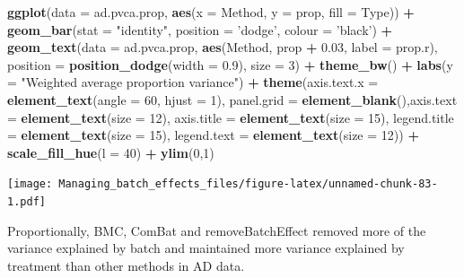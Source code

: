 \documentclass[]{book}
\newenvironment{Shaded}{\begin{snugshade}}{\end{snugshade}}
\newcommand{\KeywordTok}[1]{\textcolor[rgb]{0.13,0.29,0.53}{\textbf{#1}}}
\newcommand{\DataTypeTok}[1]{\textcolor[rgb]{0.13,0.29,0.53}{#1}}
\newcommand{\DecValTok}[1]{\textcolor[rgb]{0.00,0.00,0.81}{#1}}
\newcommand{\FloatTok}[1]{\textcolor[rgb]{0.00,0.00,0.81}{#1}}
\newcommand{\StringTok}[1]{\textcolor[rgb]{0.31,0.60,0.02}{#1}}
\newcommand{\OperatorTok}[1]{\textcolor[rgb]{0.81,0.36,0.00}{\textbf{#1}}}
\newcommand{\NormalTok}[1]{#1}
\begin{document}
\begin{Shaded}
\begin{Highlighting}[]
\KeywordTok{ggplot}\NormalTok{(}\DataTypeTok{data =}\NormalTok{ ad.pvca.prop, }\KeywordTok{aes}\NormalTok{(}\DataTypeTok{x =}\NormalTok{ Method, }\DataTypeTok{y =}\NormalTok{ prop, }\DataTypeTok{fill =}\NormalTok{ Type)) }\OperatorTok{+}\StringTok{ }
\StringTok{  }\KeywordTok{geom_bar}\NormalTok{(}\DataTypeTok{stat =} \StringTok{"identity"}\NormalTok{, }\DataTypeTok{position =} \StringTok{'dodge'}\NormalTok{, }\DataTypeTok{colour =} \StringTok{'black'}\NormalTok{) }\OperatorTok{+}\StringTok{ }
\StringTok{  }\KeywordTok{geom_text}\NormalTok{(}\DataTypeTok{data =}\NormalTok{ ad.pvca.prop, }\KeywordTok{aes}\NormalTok{(Method, prop }\OperatorTok{+}\StringTok{ }\FloatTok{0.03}\NormalTok{, }\DataTypeTok{label =}\NormalTok{ prop.r), }
            \DataTypeTok{position =} \KeywordTok{position_dodge}\NormalTok{(}\DataTypeTok{width =} \FloatTok{0.9}\NormalTok{), }\DataTypeTok{size =} \DecValTok{3}\NormalTok{) }\OperatorTok{+}\StringTok{ }\KeywordTok{theme_bw}\NormalTok{() }\OperatorTok{+}\StringTok{ }
\StringTok{  }\KeywordTok{labs}\NormalTok{(}\DataTypeTok{y =} \StringTok{"Weighted average proportion variance"}\NormalTok{) }\OperatorTok{+}\StringTok{ }
\StringTok{  }\KeywordTok{theme}\NormalTok{(}\DataTypeTok{axis.text.x =} \KeywordTok{element_text}\NormalTok{(}\DataTypeTok{angle =} \DecValTok{60}\NormalTok{, }\DataTypeTok{hjust =} \DecValTok{1}\NormalTok{), }
        \DataTypeTok{panel.grid =} \KeywordTok{element_blank}\NormalTok{(),}\DataTypeTok{axis.text =} \KeywordTok{element_text}\NormalTok{(}\DataTypeTok{size =} \DecValTok{12}\NormalTok{), }
        \DataTypeTok{axis.title =} \KeywordTok{element_text}\NormalTok{(}\DataTypeTok{size =} \DecValTok{15}\NormalTok{), }\DataTypeTok{legend.title =} \KeywordTok{element_text}\NormalTok{(}\DataTypeTok{size =} \DecValTok{15}\NormalTok{), }
        \DataTypeTok{legend.text =} \KeywordTok{element_text}\NormalTok{(}\DataTypeTok{size =} \DecValTok{12}\NormalTok{)) }\OperatorTok{+}\StringTok{ }\KeywordTok{scale_fill_hue}\NormalTok{(}\DataTypeTok{l =} \DecValTok{40}\NormalTok{) }\OperatorTok{+}\StringTok{ }\KeywordTok{ylim}\NormalTok{(}\DecValTok{0}\NormalTok{,}\DecValTok{1}\NormalTok{)}
\end{Highlighting}
\end{Shaded}

\texttt{[image: Managing\_batch\_effects\_files/figure-latex/unnamed-chunk-83-1.pdf]}

Proportionally, BMC, ComBat and removeBatchEffect removed more of the
variance explained by batch and maintained more variance explained by
treatment than other methods in AD data.
\end{document}
